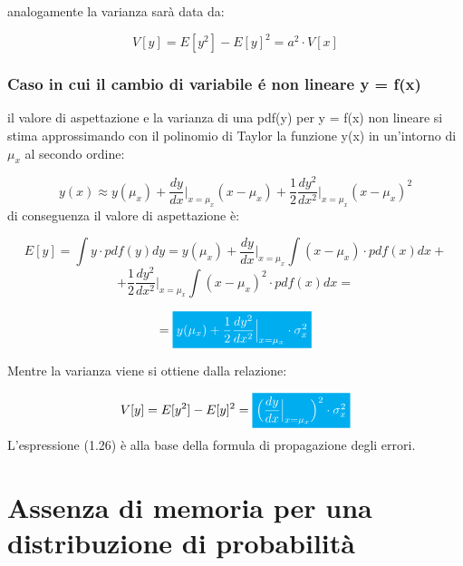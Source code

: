  analogamente la varianza sar\`{a} data da:
 
 \begin{equation}
 	V[y] = E[y^2] - E[y]^2 = a^2 \cdot V[x]
 \end{equation}

 \subsubsection{Caso in cui il cambio di variabile \'{e} non lineare y = f(x)}
 
 il valore di aspettazione e la varianza di una pdf(y) per y = f(x) non lineare si stima approssimando con il polinomio di Taylor la funzione y(x) in un'intorno di $\mu_x$ al secondo ordine:
 
 \begin{equation*}
 y(x) \approx y(\mu_x) + \dfrac{dy}{dx}\Big\vert_{x = \mu_x}(x-\mu_x) + \dfrac{1}{2}\dfrac{dy^2}{dx^2}\Big\vert_{x = \mu_x}(x-\mu_x)^2
 \end{equation*}
 \newline
 di conseguenza il valore di aspettazione \`{e}:
 
\begin{equation*}
 	E[y] = \int y \cdot pdf(y)dy = y(\mu_x) + \dfrac{dy}{dx}\Big\vert_{x = \mu_x}\int{(x-\mu_x)\cdot pdf(x)dx} + 
 \end{equation*}
 \begin{equation*}
 	+ \dfrac{1}{2}\dfrac{dy^2}{dx^2}\Big\vert_{x = \mu_x} \int{(x-\mu_x)^2 \cdot pdf(x)dx} = 
 \end{equation*}
 
 \begin{equation}
 	= \colorbox{cyan}{\textcolor{white}{$y(\mu_x) + \dfrac{1}{2}\dfrac{dy^2}{dx^2}\Big\vert_{x = \mu_x} \cdot \sigma_{x}^2$}}
 \end{equation}
\newline

Mentre la varianza viene si ottiene dalla relazione:

\begin{equation}
	V[y] = E[y^2] - E[y]^2 = \colorbox{cyan}{\textcolor{white}{$\Big(\dfrac{dy}{dx}\Big \vert_{x = \mu_x}\Big)^2 \cdot \sigma_{x}^2$}} 
\end{equation}
\newline
L'espressione (1.26) \`{e} alla base della formula di propagazione degli errori.

\section{Assenza di memoria per una distribuzione di probabilit\`{a}}

